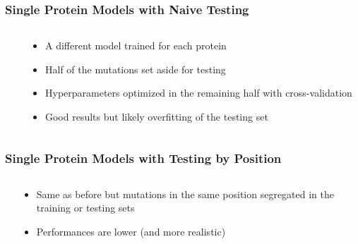 \documentclass[10pt, british, luatex]{beamer}
\begin{document}
\begin{frame}
	\frametitle{Single Protein Models with Naive Testing}
	\begin{columns}[c]
		\begin{column}{.6\textwidth}
			\centering%
			\vspace{1em}
			{%
				\let\bfseries\sbseries%
				
			}
		\end{column}
		\begin{column}{.4\textwidth}
			\begin{itemize}
				\item A different model trained for each protein
				\item Half of the mutations set aside for testing
				\item Hyperparameters optimized in the remaining half with cross-validation
				\item Good results but likely overfitting of the testing set
			\end{itemize}
		\end{column}
	\end{columns}
\end{frame}

\begin{frame}
	\frametitle{Single Protein Models with Testing by Position}
	\begin{columns}[c]
		\begin{column}{.6\textwidth}
			\centering%
			\vspace{1em}
			{%
				\let\bfseries\sbseries%
				
			}
		\end{column}
		\begin{column}{.4\textwidth}
			\begin{itemize}
				\item Same as before but mutations in the same position segregated in the training or testing sets
				\item Performances are lower (and more realistic)
			\end{itemize}
		\end{column}
	\end{columns}
\end{frame}
\end{document}
